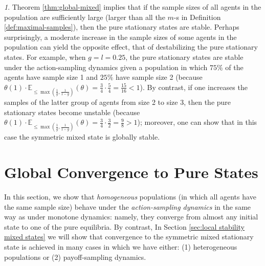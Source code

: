 \documentclass[12pt]{article}
\numberwithin{equation}{section}
\numberwithin{figure}{section}
\theoremstyle{definition}
\theoremstyle{plain}
\theoremstyle{plain}
\theoremstyle{plain}
\theoremstyle{remark}
\newtheorem{rem}{\protect\remarkname}
\theoremstyle{plain}
\theoremstyle{plain}
\providecommand{\remarkname}{Remark}
\begin{document}
\begin{rem}
Theorem \ref{thm:global-mixed} implies that if the sample sizes of all agents in the population are sufficiently large (larger than all the $m$-s in Definition \ref{def:maximal-samples}), then the pure stationary states are stable.
Perhaps surprisingly, a moderate increase in the sample sizes of some agents in the population can yield the opposite effect, that of destabilizing the pure stationary states. For example, when $g=l=0.25$, the pure stationary states are  stable under the action-sampling dynamics given a population in which $75\%$ of the agents have sample size 1 and $25\%$ have sample size 2 (because $\theta(1)\cdot\mathbb{E}_{\leq \max\left(\frac{1}{g},\frac{1}{1-g}\right)}\left(\theta\right)=\frac{3}{4}\cdot\frac{5}{4}=\frac{15}{16}<1$). By contrast, if one increases the samples of the latter group of agents from size 2 to size 3, then the pure stationary states become unstable (because $\theta(1)\cdot\mathbb{E}_{\leq \max\left(\frac{1}{g},\frac{1}{1-g}\right)}\left(\theta\right)=\frac{3}{4}\cdot\frac{3}{2}=\frac{9}{8}>1$); moreover, one can show that in this case the symmetric mixed state is globally stable.
\end{rem}
\section{Global Convergence to Pure States}\label{sec-conv-to-pure}
In this section, we show that \emph{homogeneous} populations (in which all agents have the same sample size) behave under the \emph{action-sampling dynamics} in the same way as under monotone dynamics: namely, they converge from almost any initial state to one of the pure equilibria. 
By contrast, In Section \ref{sec:local stability mixed states} we will show that 
convergence  to the symmetric mixed stationary state is achieved in many cases in which we have either: (1)  heterogeneous  populations or (2) payoff-sampling dynamics.
\end{document}
